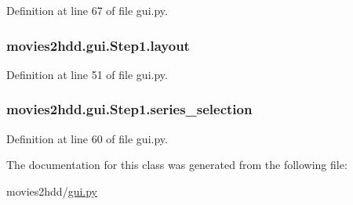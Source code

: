 Definition at line 67 of file gui.\-py.

\hypertarget{classmovies2hdd_1_1gui_1_1_step1_ac872defae6a2ec8fa87724017327180f}{
\subsubsection[{layout}]{\setlength{\rightskip}{0pt plus 5cm}movies2hdd.\-gui.\-Step1.\-layout}}\label{classmovies2hdd_1_1gui_1_1_step1_ac872defae6a2ec8fa87724017327180f}


Definition at line 51 of file gui.\-py.

\hypertarget{classmovies2hdd_1_1gui_1_1_step1_a7de4eabf338df8f4e5ebad68f8235d78}{
\subsubsection[{series\-\_\-selection}]{\setlength{\rightskip}{0pt plus 5cm}movies2hdd.\-gui.\-Step1.\-series\-\_\-selection}}\label{classmovies2hdd_1_1gui_1_1_step1_a7de4eabf338df8f4e5ebad68f8235d78}


Definition at line 60 of file gui.\-py.



The documentation for this class was generated from the following file\-:\begin{DoxyCompactItemize}
\item 
movies2hdd/\hyperlink{gui_8py}{gui.\-py}\end{DoxyCompactItemize}
